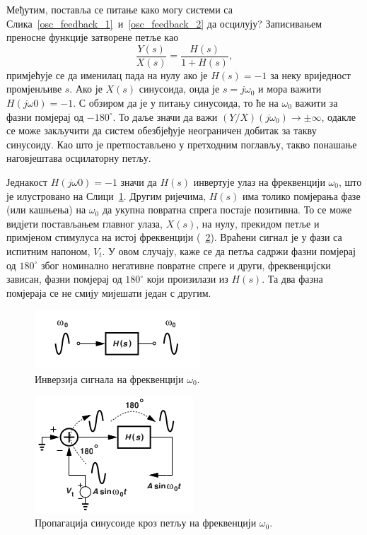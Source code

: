 \documentclass[master]{finthesis}
\begin{document}
Међутим, поставља се питање како могу системи са Слика~\ref{osc_feedback_1}~и~\ref{osc_feedback_2} да осцилују? Записивањем преносне функције затворене петље као 
\begin{equation} 
	\label{transfer_function}
	\frac{Y(s)}{X(s)}=\frac{H(s)}{1+H(s)},
\end{equation}
примјећује се да именилац пада на нулу ако је $H(s)=-1$ за неку вриједност промјенљиве $s$. Ако је $X(s)$ синусоида, онда је $s=j\omega_{0}$ и мора важити $H(j\omega{0})=-1$. С обзиром да је у питању синусоида, то ће на $\omega_{0}$ важити за фазни помјерај од $-180^{\circ}$. То даље значи да важи $(Y/X)(j\omega_{0}) \rightarrow \pm\infty$, одакле се може закључити да систем обезбјеђује неограничен добитак за такву синусоиду. Као што је претпостављено у претходним поглављу, такво понашање наговјештава осцилаторну петљу. \par
Једнакост $H(j\omega{0})=-1$ значи да $H(s)$ инвертује улаз на фреквенцији $\omega_{0}$, што је илустровано на Слици~\ref{osc_feedback_3}. Другим ријечима, $H(s)$ има толико помјерања фазе (или кашњења) на $\omega_{0}$ да укупна повратна спрега постаје позитивна. То се може видјети постављањем главног улаза, $X(s)$, на нулу, прекидом петље и примјеном стимулуса на истој фреквенцији (\figurename~\ref{osc_feedback_4}). Враћени сигнал је у фази са испитним напоном, $V_{t}$. У овом случају, каже се да петља садржи фазни помјерај од $180^{\circ}$ због номинално негативне повратне спреге и други, фреквенцијски зависан, фазни помјерај од $180^{\circ}$ који произилази из $H(s)$. Та два фазна помјераја се не смију мијешати један с другим. \par
\begin{figure}[!ht]
	 \centering
	 \includegraphics[scale=0.8]{slike/osc_feedback_3.png}
	 \caption{Инверзија сигнала на фреквенцији $\omega_{0}$.}
	 \label{osc_feedback_3}
\end{figure}
\begin{figure}[!ht]
	 \centering
	 \includegraphics[scale=0.8]{slike/osc_feedback_4.png}
	 \caption{Пропагација синусоиде кроз петљу на фреквенцији $\omega_{0}$.}
	 \label{osc_feedback_4}
\end{figure}
\end{document}
